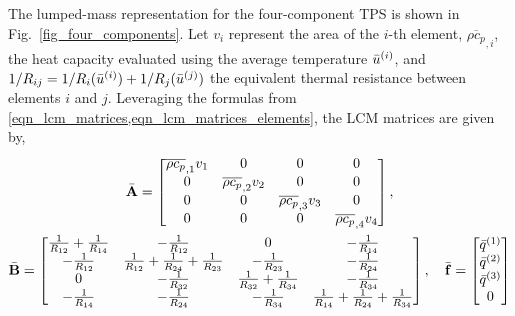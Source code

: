 The lumped-mass representation for the four-component TPS is shown in Fig.~\ref{fig_four_components}. Let $v_i$ represent the area of the $i$-th element, $\overline{\rho c_p}_{,i}$, the heat capacity evaluated using the average temperature $\bar{u}^{(i)}$, and $1/R_{ij} = 1/R_{i}(\bar{u}^{(i)}) + 1/R_{j}(\bar{u}^{(j)})$ the equivalent thermal resistance between elements $i$ and $j$. Leveraging the formulas from \cref{eqn_lcm_matrices,eqn_lcm_matrices_elements}, the LCM matrices are given by,
\begin{subequations}
    \begin{gather}
        \bar{\mathbf{A}} = \begin{bmatrix}
            \overline{\rho c_p}_{,1} v_1 & 0 & 0 & 0\\
            0 & \overline{\rho c_p}_{,2} v_2 & 0 & 0\\
            0 & 0 & \overline{\rho c_p}_{,3} v_3 & 0\\
            0 & 0 & 0 & \overline{\rho c_p}_{,4} v_4
        \end{bmatrix},\\
        \bar{\mathbf{B}} = \begin{bmatrix}
            \frac{1}{R_{12}} + \frac{1}{R_{14}} & -\frac{1}{R_{12}} & 0 & -\frac{1}{R_{14}}\\
            -\frac{1}{R_{12}} & \frac{1}{R_{12}} + \frac{1}{R_{24}} + \frac{1}{R_{23}} & -\frac{1}{R_{23}} & -\frac{1}{R_{24}}\\
            0 & -\frac{1}{R_{32}} & \frac{1}{R_{32}} + \frac{1}{R_{34}} & -\frac{1}{R_{34}}\\
            -\frac{1}{R_{14}} & -\frac{1}{R_{24}} & -\frac{1}{R_{34}} & \frac{1}{R_{14}} + \frac{1}{R_{24}} + \frac{1}{R_{34}}
        \end{bmatrix},\quad \bar{\mathbf{f}} = \begin{bmatrix}
            \bar{q}^{(1)} \\
            \bar{q}^{(2)} \\
            \bar{q}^{(3)} \\
            0
        \end{bmatrix}
    \end{gather}
\end{subequations}


